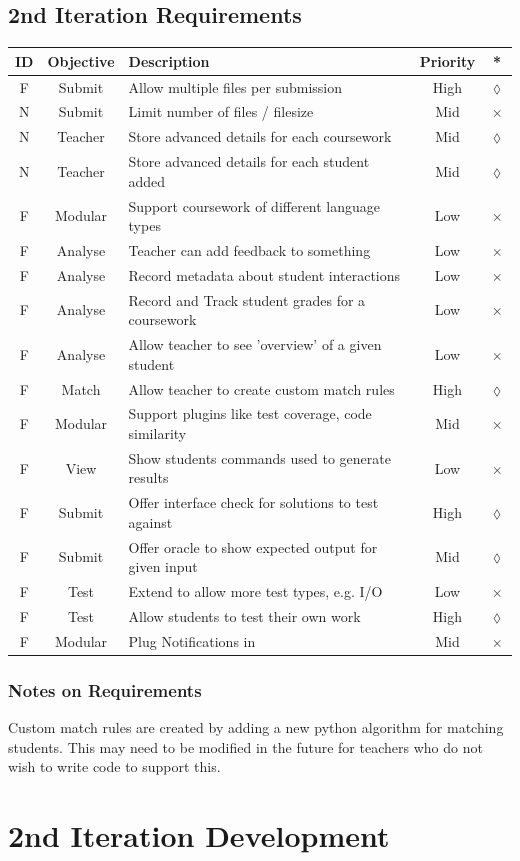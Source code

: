 \documentclass[a4paper,11pt]{report}
\newcounter{FunCount}
\newcounter{NFunCount}
\newcommand{\freq}[4]{\addtocounter{FunCount}{1}F\arabic{FunCount} & #1 & #2 & #3 & #4\\}
\newcommand{\nfreq}[4]{\addtocounter{NFunCount}{1}N\arabic{NFunCount} & #1 & #2 & #3 & #4\\}
\begin{document}
\subsection{2nd Iteration Requirements}
\begin{longtable}{ccl@{}cc}
\label{tab:protoreq2}
\textbf{ID} & \textbf{Objective} & \textbf{Description} & \textbf{Priority} & \textbf{*}\\\hline
\freq{Submit}{Allow multiple files per submission}{High}{$\lozenge$}
\nfreq{Submit}{Limit number of files / filesize}{Mid}{$\times$}
\nfreq{Teacher}{Store advanced details for each coursework}{Mid}{$\lozenge$}
\nfreq{Teacher}{Store advanced details for each student added}{Mid}{$\lozenge$}
\freq{Modular}{Support coursework of different language types}{Low}{$\times$}
\freq{Analyse}{Teacher can add feedback to something}{Low}{$\times$}
\freq{Analyse}{Record metadata about student interactions}{Low}{$\times$}
\freq{Analyse}{Record and Track student grades for a coursework}{Low}{$\times$}
\freq{Analyse}{Allow teacher to see 'overview' of a given student}{Low}{$\times$}
\freq{Match}{Allow teacher to create custom match rules}{High}{$\lozenge$}
\freq{Modular}{Support plugins like test coverage, code similarity}{Mid}{$\times$}
\freq{View}{Show students commands used to generate results}{Low}{$\times$}
\freq{Submit}{Offer interface check for solutions to test against}{High}{$\lozenge$}
\freq{Submit}{Offer oracle to show expected output for given input}{Mid}{$\lozenge$}
\freq{Test}{Extend to allow more test types, e.g. I/O}{Low}{$\times$}
\freq{Test}{Allow students to test their own work}{High}{$\lozenge$}
\freq{Modular}{Plug Notifications in}{Mid}{$\times$}
\end{longtable}
\subsubsection{Notes on Requirements}
Custom match rules are created by adding a new python algorithm for matching students. This may need to be modified in the future for teachers who do not wish to write code to support this.

\section{2nd Iteration Development}
\end{document}
